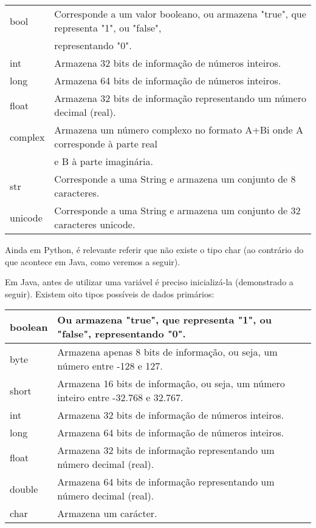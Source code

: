 \documentclass[11pt,openright,twoside]{report}
\begin{document}
\begin{table}[h]
\begin{tabular}{|l|l|}
\hline
bool & Corresponde a um valor booleano, ou armazena "true", que representa "1", ou "false", \\
& representando "0".            \\
\hline
int     & Armazena 32 bits de informação de números inteiros.                               \\
\hline
long    & Armazena 64 bits de informação de números inteiros.                               \\
\hline
float   & Armazena 32 bits de informação representando um número decimal (real).            \\
\hline
complex   & Armazena um número complexo no formato A+Bi onde A corresponde à parte real     \\
& e B à parte imaginária.            \\
\hline
str    & Corresponde a uma String e armazena um conjunto de 8 caracteres.        \\
\hline
unicode   & Corresponde a uma String e armazena um conjunto de 32 caracteres unicode.                                                          \\             
\hline                                                                      
\end{tabular}
\end{table}

Ainda em Python, é relevante referir que não existe o tipo char (ao contrário do que acontece em Java, como veremos a seguir).

\smallskip

Em Java, antes de utilizar uma variável é preciso inicializá-la (demonstrado a seguir). Existem oito tipos possíveis de dados primários:
\begin{table}[h]
\begin{tabular}{|l|l|}
\hline
boolean & Ou armazena "true", que representa "1", ou "false", representando "0".            \\
\hline
byte    & Armazena apenas 8 bits de informação, ou seja, um número entre -128 e 127.        \\ \hline
short   & Armazena 16 bits de informação, ou seja, um número inteiro entre -32.768 e 32.767.\\
\hline
int     & Armazena 32 bits de informação de números inteiros.                               \\
\hline
long    & Armazena 64 bits de informação de números inteiros.                               \\
\hline
float   & Armazena 32 bits de informação representando um número decimal (real).            \\
\hline
double  & Armazena 64 bits de informação representando um número decimal (real).            \\
\hline
char    & Armazena um carácter.                                                           \\                                                                                
\hline
\end{tabular}
\end{table}
\end{document}
